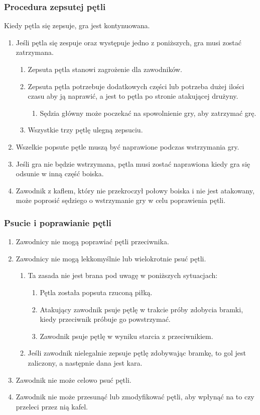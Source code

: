 \documentclass[11pt,a4paper]{article}
\begin{document}
\subsubsection{Procedura zepsutej pętli}
Kiedy pętla się zepsuje, gra jest kontynuowana.
\begin{enumerate}
  \item Jeśli pętla się zespuje oraz występuje jedno z poniższych, gra musi zostać zatrzymana.
  \begin{enumerate}
    \item Zepsuta pętla stanowi zagrożenie dla zawodników.
    \item Zepsuta pętla potrzebuje dodatkowych części lub potrzeba dużej ilości czasu aby ją naprawić, a jest to pętla po stronie atakującej drużyny.
    \begin{enumerate}
      \item Sędzia główny może poczekać na spowolnienie gry, aby zatrzymać grę.
    \end{enumerate}
    \item Wszystkie trzy pętlę ulegną zepsuciu.
  \end{enumerate}
  \item Wszelkie popsute pętle muszą być naprawione podczas wstrzymania gry.
  \item Jeśli gra nie będzie wstrzymana, pętla musi zostać naprawiona kiedy gra się odsunie w inną część boiska.
  \item Zawodnik z kaflem, który nie przekroczył połowy boiska i nie jest atakowany, może poprosić sędziego o wstrzymanie gry w celu poprawienia pętli.
\end{enumerate}

\subsubsection{Psucie i poprawianie pętli}
\begin{enumerate}
  \item Zawodnicy nie mogą poprawiać pętli przeciwnika.
  \item Zawodnicy nie mogą lekkomyślnie lub wielokrotnie psuć pętli.
  \begin{enumerate}
    \item Ta zasada nie jest brana pod uwagę w poniższych sytuacjach:
    \begin{enumerate}
      \item Pętla została popsuta rzuconą piłką.
      \item Atakujący zawodnik psuje pętlę w trakcie próby zdobycia bramki, kiedy przeciwnik próbuje go powstrzymać.
      \item Zawodnik psuje pętlę w wyniku starcia z przeciwnikiem.
    \end{enumerate}
    \item Jeśli zawodnik nielegalnie zepsuje pętlę zdobywając bramkę, to gol jest zaliczony, a następnie dana jest kara.
  \end{enumerate}
  \item Zawodnik nie może celowo psuć pętli.
  \item Zawodnik nie może przesunąć lub zmodyfikować pętli, aby wpłynąć na to czy przeleci przez nią kafel.
\end{enumerate}
\end{document}
